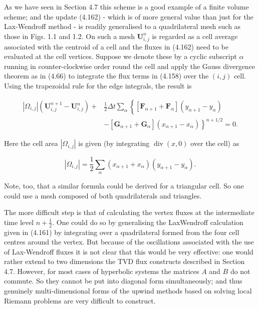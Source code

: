 \documentclass[10pt]{article}
\begin{document}
As we have seen in Section 4.7 this scheme is a good example of a finite volume scheme; and the update (4.162) - which is of more general value than just for the Lax-Wendroff method - is readily generalised to a quadrilateral mesh such as those in Figs. 1.1 and 1.2. On such a mesh \(\mathbf{U}_{i, j}^{n}\) is regarded as a cell average associated with the centroid of a cell and the fluxes in (4.162) need to be evaluated at the cell vertices. Suppose we denote these by a cyclic subscript \(\alpha\) running in counter-clockwise order round the cell and apply the Gauss divergence theorem as in (4.66) to integrate the flux terms in (4.158) over the \((i, j)\) cell. Using the trapezoidal rule for the edge integrals, the result is

\[
\begin{aligned}
\left|\Omega_{i, j}\right|\left(\mathbf{U}_{i, j}^{n+1}-\mathbf{U}_{i, j}^{n}\right)+ & \frac{1}{2} \Delta t \sum_{\alpha}\left\{\left[\mathbf{F}_{\alpha+1}+\mathbf{F}_{\alpha}\right]\left(y_{\alpha+1}-y_{\alpha}\right)\right. \\
& \left.-\left[\mathbf{G}_{\alpha+1}+\mathbf{G}_{\alpha}\right]\left(x_{\alpha+1}-x_{\alpha}\right)\right\}^{n+1 / 2}=0 .
\end{aligned}
\]

Here the cell area \(\left|\Omega_{i, j}\right|\) is given (by integrating \(\operatorname{div}(x, 0)\) over the cell) as

\[
\left|\Omega_{i, j}\right|=\frac{1}{2} \sum_{\alpha}\left(x_{\alpha+1}+x_{\alpha}\right)\left(y_{\alpha+1}-y_{\alpha}\right) .
\]

Note, too, that a similar formula could be derived for a triangular cell. So one could use a mesh composed of both quadrilaterals and triangles.

The more difficult step is that of calculating the vertex fluxes at the intermediate time level \(n+\frac{1}{2}\). One could do so by generalising the LaxWendroff calculation given in (4.161) by integrating over a quadrilateral formed from the four cell centres around the vertex. But because of the oscillations associated with the use of Lax-Wendroff fluxes it is not clear that this would be very effective: one would rather extend to two dimensions the TVD flux constructs described in Section 4.7. However, for most cases of hyperbolic systems the matrices \(A\) and \(B\) do not commute. So they cannot be put into diagonal form simultaneously; and thus genuinely multi-dimensional forms of the upwind methods based on solving local Riemann problems are very difficult to construct.
\end{document}
